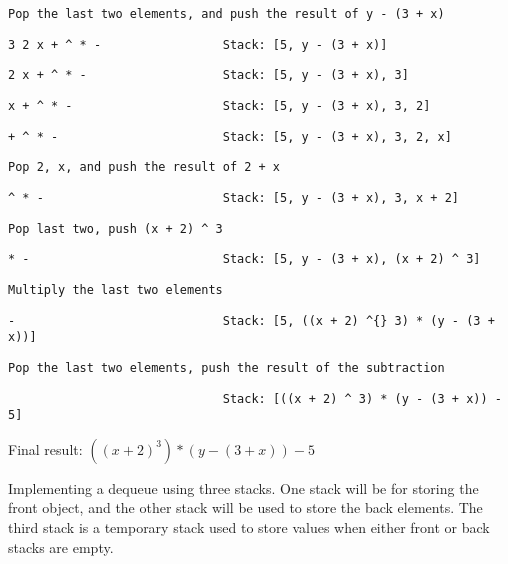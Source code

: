 \documentclass[11pt,largemargins]{homework}
\begin{document}
\begin{alphaparts}
\verb|Pop the last two elements, and push the result of y - (3 + x)|

\verb|3 2 x + ^ * -                 Stack: [5, y - (3 + x)]|


\verb|2 x + ^ * -                   Stack: [5, y - (3 + x), 3]|


\verb|x + ^ * -                     Stack: [5, y - (3 + x), 3, 2]|


\verb|+ ^ * -                       Stack: [5, y - (3 + x), 3, 2, x]|


\verb|Pop 2, x, and push the result of 2 + x|

\verb|^ * -                         Stack: [5, y - (3 + x), 3, x + 2]|


\verb|Pop last two, push (x + 2) ^ 3|

\verb|* -                           Stack: [5, y - (3 + x), (x + 2) ^ 3]|


\verb|Multiply the last two elements|

\verb|-                             Stack: [5, ((x + 2) ^{} 3) * (y - (3 + x))]|


\verb|Pop the last two elements, push the result of the subtraction|

\verb|                              Stack: [((x + 2) ^ 3) * (y - (3 + x)) - 5]|


    Final result: $((x + 2) ^ 3) * (y - (3 + x)) - 5$


\end{alphaparts}


\newpage
\question

Implementing a dequeue using three stacks. One stack will be for storing the front object, and the other stack will be used to store the back elements. The third stack is a temporary stack used to store values when either front or back stacks are empty.
\end{document}
